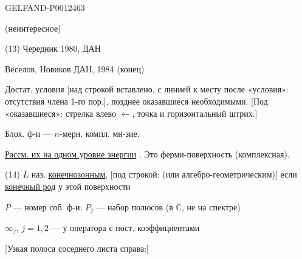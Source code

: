 \begin{GelfandAdjacentEvidence}{GELFAND-P001246}{3}


(неинтересное)

(13) Чередник 1980, ДАН

Веселов, Новиков ДАН, 1984 (конец)

Достат. условия [над строкой вставлено, с линией к месту после «условия»: отсутствия члена 1-го пор.], позднее оказавшиеся необходимыми.
[Под «оказавшиеся»: стрелка влево $\longleftarrow$, точка и горизонтальный штрих.]

Блох. ф-и — $n$-мерн. компл. мн-зие.

\underline{Рассм. их на одном уровне энергии} . Это ферми-поверхность (комплексная).

(14) $L$ наз. \underline{конечнозонным}, [под строкой: (или алгебро-геометрическим)] если \underline{конечный род} у этой поверхности

$P$ — номер соб. ф-и; $P_j$ — набор полюсов (в $\mathbb C$, не на спектре)

$\infty_j$, $j=1,2$ — у оператора с пост. коэффициентами

[Узкая полоса соседнего листа справа:]
\end{GelfandAdjacentEvidence}



